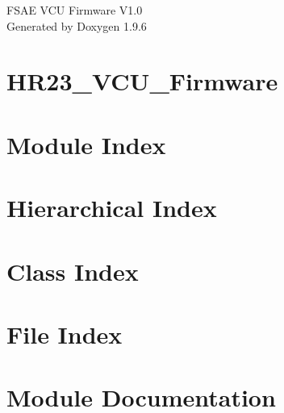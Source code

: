 \documentclass[twoside]{book}
\newcommand{\+}{\discretionary{\mbox{\scriptsize$\hookleftarrow$}}{}{}}
\newcommand{\clearemptydoublepage}{%
    \newpage{\pagestyle{empty}\cleardoublepage}%
  }
\begin{document}
  \raggedbottom
    \hypersetup{pageanchor=false,
                bookmarksnumbered=true,
                pdfencoding=unicode
               }
  \begin{titlepage}
  \vspace*{7cm}
  \begin{center}%
  {\Large FSAE VCU Firmware V1.\+0}\\
  \vspace*{1cm}
  {\large Generated by Doxygen 1.9.6}\\
  \end{center}
  \end{titlepage}
  \clearemptydoublepage
  \tableofcontents
  \clearemptydoublepage
  \hypersetup{pageanchor=true}
\chapter{HR23\+\_\+\+VCU\+\_\+\+Firmware}
\label{md__r_e_a_d_m_e}

\chapter{Module Index}

\chapter{Hierarchical Index}

\chapter{Class Index}

\chapter{File Index}

\chapter{Module Documentation}


































\end{document}
